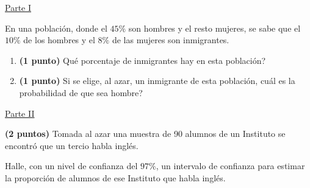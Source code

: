 
\noindent\underline{Parte I}

En una población, donde el $45\%$ son hombres y el resto mujeres, se sabe que el $10\%$ de los hombres y el $8\%$ de las mujeres son inmigrantes.
\begin{enumerate}[label=\alph*)]
\item \textbf{(1 punto)} \textquestiondown{}Qué porcentaje de inmigrantes hay en esta población?
\item \textbf{(1 punto)} Si se elige, al azar, un inmigrante de esta población, \textquestiondown{}cuál es la probabilidad de que sea hombre?
\end{enumerate}
\par\noindent\begin{minipage}{\linewidth}
\noindent\underline{Parte II}

\textbf{(2 puntos)} Tomada al azar una muestra de 90 alumnos de un Instituto se encontró que un tercio habla inglés.

Halle, con un nivel de confianza del $97\%$, un intervalo de confianza para estimar la proporción de alumnos de ese Instituto que habla inglés.
\end{minipage}\par
